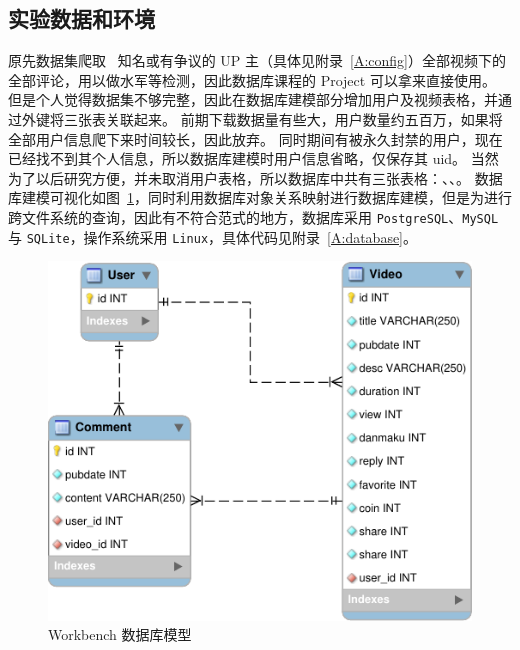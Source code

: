 \subsection{实验数据和环境}
原先数据集爬取 \bilibili\ 知名或有争议的 UP 主（具体见附录~\ref{A:config}）全部视频下的全部评论，用以做水军等检测，因此数据库课程的 Project 可以拿来直接使用。
但是个人觉得数据集不够完整，因此在数据库建模部分增加用户及视频表格，并通过外键将三张表关联起来。
前期下载数据量有些大，用户数量约五百万，如果将全部用户信息爬下来时间较长，因此放弃。
同时期间有被永久封禁的用户，现在已经找不到其个人信息，所以数据库建模时用户信息省略，仅保存其 uid。
当然为了以后研究方便，并未取消用户表格，所以数据库中共有三张表格：、、。
数据库建模可视化如图~\ref{F:workbench-model}，同时利用数据库对象关系映射\cite{sqlalchemy2020sqlalchemy}进行数据库建模，但是为进行跨文件系统的查询，因此有不符合范式的地方，数据库采用 \texttt{PostgreSQL}、\texttt{MySQL} 与 \texttt{SQLite}，操作系统采用 \texttt{Linux}，具体代码见附录~\ref{A:database}。

\begin{figure}[H]
    \centering
    \includegraphics[width=.5\textwidth]{figures/1.pdf}
    \caption{Workbench 数据库模型}\label{F:workbench-model}
\end{figure}

